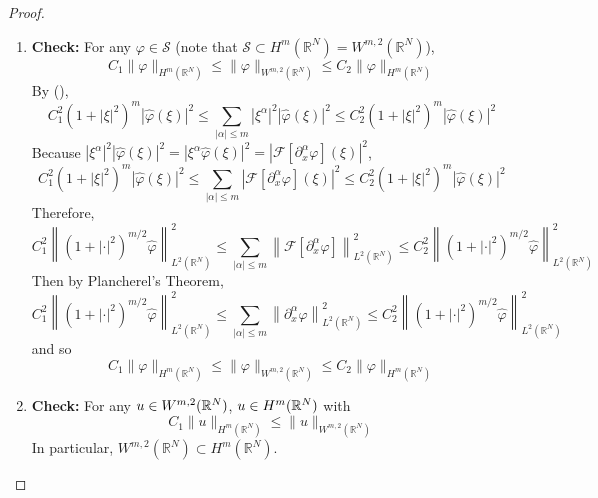 \begin{proof}
\begin{enumerate}[label=(\Roman{*})]
		\item \textbf{Check:} For any $\varphi \in \mathcal{S}$ (note that $\mathcal{S} \subset H^m\left(\mathbb{R}^N\right) = W^{m, 2}\left(\mathbb{R}^N\right)$),
		\begin{equation*}
			C_1\|\varphi\|_{H^m\left(\mathbb{R}^N\right)} \leq\|\varphi\|_{W^{m, 2}\left(\mathbb{R}^N\right)} \leq C_2\|\varphi\|_{H^m\left(\mathbb{R}^N\right)}
		\end{equation*}
		By (),
		\begin{equation*}
			C_1^2\left(1+|\xi|^2\right)^m|\widehat{\varphi}(\xi)|^2 \leq \sum_{|\alpha| \leq m}\left|\xi^\alpha\right|^2|\widehat{\varphi}(\xi)|^2 \leq C_2^2\left(1+|\xi|^2\right)^m|\widehat{\varphi}(\xi)|^2
		\end{equation*}
		Because $\left|\xi^\alpha\right|^2|\widehat{\varphi}(\xi)|^2=\left|\xi^\alpha \widehat{\varphi}(\xi)\right|^2=\left|\mathcal{F}\left[\partial_x^\alpha \varphi\right](\xi)\right|^2$,
		\begin{equation*}
			C_1^2\left(1+|\xi|^2\right)^m|\widehat{\varphi}(\xi)|^2 \leq \sum_{|\alpha| \leq m}\left|\mathcal{F}\left[\partial_x^\alpha \varphi\right](\xi)\right|^2 \leq C_2^2\left(1+|\xi|^2\right)^m|\widehat{\varphi}(\xi)|^2
		\end{equation*}
		Therefore, 
		\begin{equation*}
			C_1^2\left\|\left(1+|\cdot|^2\right)^{m / 2} \widehat{\varphi}\right\|_{L^2\left(\mathbb{R}^N\right)}^2 \leq \sum_{|\alpha| \leq m}\left\|\mathcal{F}\left[\partial_x^\alpha \varphi\right]\right\|_{L^2\left(\mathbb{R}^N\right)}^2 \leq C_2^2\left\|\left(1+|\cdot|^2\right)^{m / 2} \widehat{\varphi}\right\|_{L^2\left(\mathbb{R}^N\right)}^2
		\end{equation*}
		Then by Plancherel's Theorem,
		\begin{equation*}
			C_1^2\left\|\left(1+|\cdot|^2\right)^{m / 2} \widehat{\varphi}\right\|_{L^2\left(\mathbb{R}^N\right)}^2 \leq \sum_{|\alpha| \leq m}\left\|\partial_x^\alpha \varphi\right\|_{L^2\left(\mathbb{R}^N\right)}^2 \leq C_2^2\left\|\left(1+|\cdot|^2\right)^{m / 2} \widehat{\varphi}\right\|_{L^2\left(\mathbb{R}^N\right)}^2
		\end{equation*}
		and so
		\begin{equation*}
			C_1\|\varphi\|_{H^m\left(\mathbb{R}^N\right)} \leq\|\varphi\|_{W^{m, 2}\left(\mathbb{R}^N\right)} \leq C_2\|\varphi\|_{H^m\left(\mathbb{R}^N\right)}
		\end{equation*}

		\item \textbf{Check:} For any $u \in W^{m,2}(\mathbb{R}^N)$, $u \in H^m(\mathbb{R}^N)$ with
		\begin{equation*}
			C_1\|u\|_{H^m\left(\mathbb{R}^N\right)} \leq\|u\|_{W^{m, 2}\left(\mathbb{R}^N\right)}
		\end{equation*}
		In particular, $W^{m, 2}\left(\mathbb{R}^N\right) \subset H^m\left(\mathbb{R}^N\right)$.


\end{enumerate}
\end{proof}
